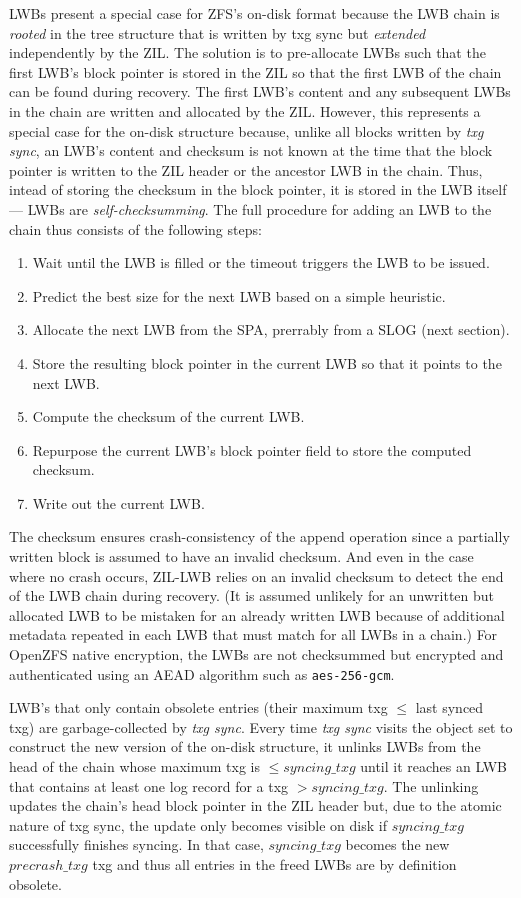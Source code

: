 \documentclass[12pt,a4paper,twoside]{book}
\begin{document}
LWBs present a special case for ZFS's on-disk format because the LWB chain is \textit{rooted} in the tree structure that is written by txg sync but \textit{extended} independently by the ZIL.
The solution is to pre-allocate LWBs such that the first LWB's block pointer is stored in the ZIL so that the first LWB of the chain can be found during recovery.
The first LWB's content and any subsequent LWBs in the chain are written and allocated by the ZIL.
However, this represents a special case for the on-disk structure because, unlike all blocks written by \textit{txg sync}, an LWB's content and checksum is not known at the time that the block pointer is written to the ZIL header or the ancestor LWB in the chain.
Thus, intead of storing the checksum in the block pointer, it is stored in the LWB itself --- LWBs are \textit{self-checksumming}.
The full procedure for adding an LWB to the chain thus consists of the following steps:
\begin{enumerate}[noitemsep]
    \item Wait until the LWB is filled or the timeout triggers the LWB to be issued.
    \item Predict the best size for the next LWB based on a simple heuristic.
    \item Allocate the next LWB from the SPA, prerrably from a SLOG (next section).
    \item Store the resulting block pointer in the current LWB so that it points to the next LWB.
    \item Compute the checksum of the current LWB.
    \item Repurpose the current LWB's block pointer field to store the computed checksum.
    \item Write out the current LWB.
\end{enumerate}
The checksum ensures crash-consistency of the append operation since a partially written block is assumed to have an invalid checksum.
And even in the case where no crash occurs, ZIL-LWB relies on an invalid checksum to detect the end of the LWB chain during recovery.
(It is assumed unlikely for an unwritten but allocated LWB to be mistaken for an already written LWB because of additional metadata repeated in each LWB that must match for all LWBs in a chain.)
For OpenZFS native encryption, the LWBs are not checksummed but encrypted and authenticated using an AEAD algorithm such as \lstinline{aes-256-gcm}.

LWB's that only contain obsolete entries (their maximum txg $\le$ last synced txg) are garbage-collected by \textit{txg sync}.
Every time \textit{txg sync} visits the object set to construct the new version of the on-disk structure, it unlinks LWBs from the head of the chain whose maximum txg is $\le syncing\_txg$ until it reaches an LWB that contains at least one log record for a txg $> syncing\_txg$.
The unlinking updates the chain's head block pointer in the ZIL header but, due to the atomic nature of txg sync, the update only becomes visible on disk if $syncing\_txg$ successfully finishes syncing.
In that case, $syncing\_txg$ becomes the new $precrash\_txg$ txg and thus all entries in the freed LWBs are by definition obsolete.
\end{document}
